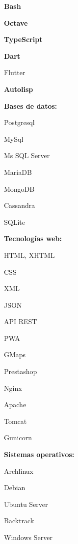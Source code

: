 \begin{itemize}
\begin{itemize*}
        \item \textbf{Bash}
        \item \textbf{Octave}
        \item \textbf{TypeScript}
        \item \textbf{Dart}
            \begin{itemize*}
                \item Flutter
            \end{itemize*}
        \item \textbf{Autolisp}
    \end{itemize*}
\item
    \textbf{Bases de datos:}
    \begin{itemize*}
        \item Postgresql
        \item MySql
        \item Ms SQL Server
        \item MariaDB
        \item MongoDB
        \item Cassandra
        \item SQLite
    \end{itemize*}
\item
    \textbf{Tecnologías web:}
    \begin{itemize*}
        \item HTML, XHTML
        \item CSS
        \item XML
        \item JSON
        \item API REST
        \item PWA
        \item GMaps
        \item Prestashop
        \item Nginx
        \item Apache
        \item Tomcat
        \item Gunicorn
    \end{itemize*}
\item
    \textbf{Sistemas operativos:}
    \begin{itemize*}
        \item Archlinux
        \item Debian
        \item Ubuntu Server
        \item Backtrack
        \item Windows Server

\end{itemize*}
\end{itemize}
